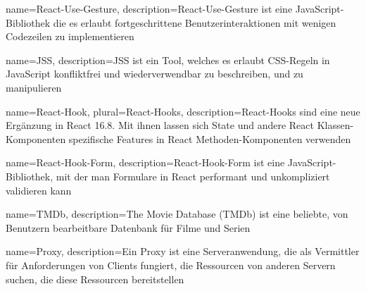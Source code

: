 {   name={React-Use-Gesture},
    description={React-Use-Gesture ist eine JavaScript-Bibliothek die es erlaubt fortgeschrittene Benutzerinteraktionen mit wenigen Codezeilen zu implementieren}
}

{   name={JSS},
    description={JSS ist ein Tool, welches es erlaubt CSS-Regeln in JavaScript konfliktfrei und wiederverwendbar zu beschreiben, und zu manipulieren}
}

{   name={React-Hook},
    plural={React-Hooks},
    description={React-Hooks sind eine neue Ergänzung in React 16.8. Mit ihnen lassen sich State und andere React Klassen-Komponenten spezifische Features in React Methoden-Komponenten verwenden}
}

{   name={React-Hook-Form},
    description={React-Hook-Form ist eine JavaScript-Bibliothek, mit der man Formulare in React performant und unkompliziert validieren kann}
}

{   name={TMDb},
    description={The Movie Database (TMDb) ist eine beliebte, von Benutzern bearbeitbare Datenbank für Filme und Serien}
}

{   name={Proxy},
    description={Ein Proxy ist eine Serveranwendung, die als Vermittler für Anforderungen von Clients fungiert, die Ressourcen von anderen Servern suchen, die diese Ressourcen bereitstellen}
}
